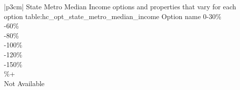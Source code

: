 \begin{customLongTable}{ |p{3cm}| }
{State Metro Median Income options and properties that vary for each option} {table:hc_opt_state_metro_median_income}
{Option name}
0-30\% \\ -60\% \\ -80\% \\ -100\% \\ -120\% \\ -150\% \\ \%+ \\ \hline
Not Available \\
\end{customLongTable}

